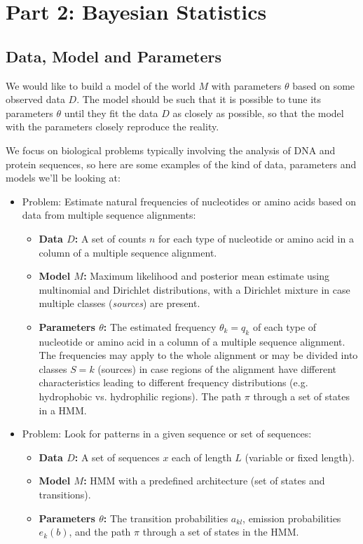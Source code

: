 
\newpage
\section{Part 2: Bayesian Statistics}

\subsection{Data, Model and Parameters}

We would like to build a model of the world $M$ with parameters $\theta$ based on some observed data $D$. The model should be such that it is possible to tune its parameters $\theta$ until they fit the data $D$ as closely as possible, so that the model with the parameters closely reproduce the reality.

We focus on biological problems typically involving the analysis of DNA and protein sequences, so here are some examples of the kind of data, parameters and models we'll be looking at:

\begin{itemize}
\item Problem: Estimate natural frequencies of nucleotides or amino acids based on data from multiple sequence alignments:
\begin{itemize}
\item {\bf Data $D$:} A set of counts $n$ for each type of nucleotide or amino acid in a column of a multiple sequence alignment.
\item {\bf Model $M$:} Maximum likelihood and posterior mean estimate using multinomial and Dirichlet distributions, with a Dirichlet mixture in case multiple classes ({\em sources}) are present.
\item {\bf Parameters $\theta$:} The estimated frequency $\theta_k=q_k$ of each type of nucleotide or amino acid in a column of a multiple sequence alignment. The frequencies may apply to the whole alignment or may be divided into classes $S=k$ (sources) in case regions of the alignment have different characteristics leading to different frequency distributions (e.g. hydrophobic vs. hydrophilic regions).
The path $\pi$ through a set of states in a HMM.
\end{itemize}
%
\item Problem: Look for patterns in a given sequence or set of sequences:
\begin{itemize}
\item {\bf Data $D$:} A set of sequences $x$ each of length $L$ (variable or fixed length).
\item {\bf Model $M$:} HMM with a predefined architecture (set of states and transitions).
\item {\bf Parameters $\theta$:} The transition probabilities $a_{kl}$, emission probabilities $e_k(b)$, and the path $\pi$ through a set of states in the HMM.
\end{itemize}
%
\end{itemize}

